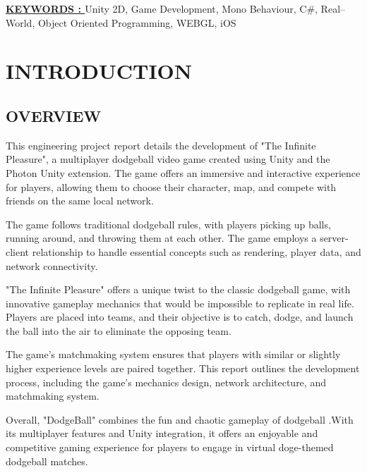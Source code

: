 \documentclass[12pt]{report}
\begin{document}
\raggedright{ \textbf \underline{KEYWORDS : }}Unity 2D, Game Development, Mono Behaviour, C\#, Real–World, Object Oriented Programming, WEBGL, iOS

\clearpage



\tableofcontents
\clearpage

\listoffigures
\thispagestyle{empty}
\clearpage
{}
\fancyhead[R]{\thepage}

\centering
\section{INTRODUCTION}
\raggedright
\subsection{OVERVIEW}
\justifying
\setlength{\parindent}{3.7em}
\setlength{\parskip}{0.5em}
\renewcommand{\baselinestretch}{1.5}
\normalsize
\hspace{1.7cm}
This engineering project report details the development of "The Infinite Pleasure", a multiplayer dodgeball video game created using Unity and the Photon Unity extension. The game offers an immersive and interactive experience for players, allowing them to choose their character, map, and compete with friends on the same local network.

The game follows traditional dodgeball rules, with players picking up balls, running around, and throwing them at each other. The game employs a server-client relationship to handle essential concepts such as rendering, player data, and network connectivity.

"The Infinite Pleasure" offers a unique twist to the classic dodgeball game, with innovative gameplay mechanics that would be impossible to replicate in real life. Players are placed into teams, and their objective is to catch, dodge, and launch the ball into the air to eliminate the opposing team.

The game's matchmaking system ensures that players with similar or slightly higher experience levels are paired together. This report outlines the development process, including the game's mechanics design, network architecture, and matchmaking system.

Overall, "DodgeBall" combines the fun and chaotic gameplay of dodgeball .With its multiplayer features and Unity integration, it offers an enjoyable and competitive gaming experience for players to engage in virtual doge-themed dodgeball matches.
\clearpage
\end{document}
